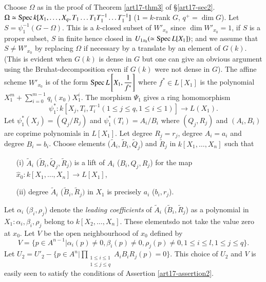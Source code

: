 \begin{romancase}%
Choose $\Omega$  as in the proof of Theorem \ref{art17-thm3} of \S \ref{art17-sec2}. $\Omega \simeq \operatorname{Spec} k [X_1, \ldots, X_q, T_1 \ldots T_1 T_1^{-1} \ldots T_1^{-1}]$ ($1 = k$-rank $G$, $q^+ = \dim G$). Let $S = \psi^{-1}_1 (G -\Omega)$. This is a $k$-closed subset of $W'_{x_0}$ since $\dim W'_{x_0} =1$, if $S$ is a proper subset, $S$ in finite hence closed in $U_{1x_0} (\simeq \operatorname{Spec} L[X_1])$; and we assume that $S \neq W'_{x_0}$ by replacing $\Omega$ if necessary by a translate by an element of $G(k)$. (This is evident when $G(k)$ is dense in $G$ but one can give an obvious argument using the Bruhat-decomposition even if $G(k)$ were not dense in $G$). The affine scheme $W'_{x_0}$ is of the form $\operatorname{Spec} L \left[X_1, \dfrac{1}{f^*} \right]$ where $f^* \in L [X_1]$ is the polynomial $X^m_1 + \sum\limits^{m-1}_{i=0} q_i (x_0) X^i_1$. The morphism $\Psi_1$ gives a ring homomorphism 
$$
\psi^*_1: k [X_j, T_i, T^{-1}_i (1 \leqslant j \leqslant q, 1 \leqslant i \leqslant 1)] \to L(X_1).
$$
Let $\psi^*_1 (X_j) = (Q_j / R_j)$ and $\psi^*_1 (T_i) = A_i/B_i $ where $(Q_j, R_j)$ and $(A_i, B_i)$ are coprime polynomials in $L[X_1]$. Let degree $R_j = r_j$, degree $A_i =a_i$ and degree $B_i = b_i$. Choose elements  ($\tilde{A}_i, \tilde{B}_i, \tilde{Q}_j$) and $\tilde{R}_j$ in $k[X_1, \ldots, X_n]$ such that 
\begin{itemize}
\item[\rm(i)] $\tilde{A}_i$ (\resp $\tilde{B}_i, \tilde{Q}_j, \tilde{R}_j)$ is a lift of $A_i$ (\resp $B_i, Q_j, R_j$) for the map $\hat{x}_0: k [X_1, \ldots, X_n] \to L [X_1]$,

\item[\rm(ii)] degree $\tilde{A}_i$ (\resp $\tilde{B}_i, \tilde{R}_j)$ in $X_1$ is precisely $a_i$ (\resp $b_i, r_j$).
\end{itemize}
Let $\alpha_i$ (\resp $\beta_i, \rho_j$) denote the {\em leading coefficients} of $\tilde{A}_i$ (\resp $\tilde{B}_i, \tilde{R}_j$) as a polynomial in $X_1: \alpha_i, \beta_i, \rho_j$ belong to $k [X_2, \ldots, X_n]$. These elements\pageoriginale do not take the value zero at $x_0$. Let $V$ be the open neighbourhood of $x_0$ defined by 
$$
V = \{p \in A^{n-1} | \alpha_i (p) \neq 0, \beta_i (p) \neq 0, \rho_j(p) \neq 0, 1 \leqslant i \leqslant l, 1 \leqslant j \leqslant q\}.
$$
Let $U_2 = U'_2 - \{p \in A^n | \prod\limits_{\substack{1 \leqslant i \leqslant 1\\ 1 \leqslant j \leqslant q}} A_i B_i R_j (p) = 0 \}$. This choice of $U_2$ and $V$ is easily seen to satisfy the conditions of Assertion \ref{art17-assertion2}.
\end{romancase}

